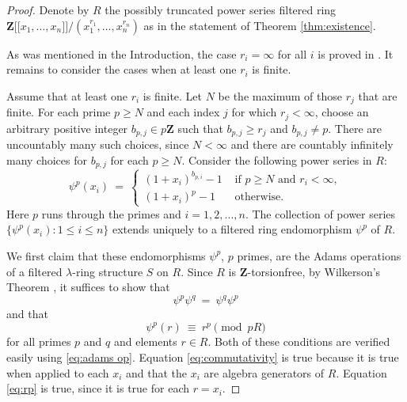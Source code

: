 \documentclass[reqno,11pt]{amsart}
\numberwithin{equation}{subsection}  %
\newcommand{\bZ}{\mathbf{Z}}
\begin{document}
\begin{proof}
Denote by $R$ the possibly truncated power series filtered ring $\bZ \lbrack \lbrack x_1, \ldots, x_n \rbrack \rbrack/(x_1^{r_1}, \ldots, x_n^{r_n})$ as in the statement of Theorem \ref{thm:existence}.


As was mentioned in the Introduction, the case $r_i = \infty$ for all $i$ is proved in \cite{yau2}.  It remains to consider the cases when at least one $r_i$ is finite.


Assume that at least one $r_i$ is finite.  Let $N$ be the maximum of those $r_j$ that are finite.  For each prime $p \geq N$ and each index $j$ for which $r_j < \infty$, choose an arbitrary positive integer $b_{p,j} \in p \bZ$ such that $b_{p,j} \geq r_j$ and $b_{p,j} \not= p$.  There are uncountably many such choices, since $N < \infty$ and there are countably infinitely many choices for $b_{p,j}$ for each $p \geq N$.  Consider the following power series in $R$:
   \begin{equation}
   \label{eq:adams op}
   \psi^p(x_i) ~=~ \begin{cases}
                   (1 + x_i)^{b_{p,i}} - 1 & \text{ if } p \geq N \text{ and } r_i < \infty, \\
                   (1 + x_i)^p - 1         & \text{ otherwise}.\end{cases}
   \end{equation}
Here $p$ runs through the primes and $i = 1, 2, \ldots, n$.  The collection of power series $\lbrace \psi^p(x_i) \colon 1 \leq i \leq n \rbrace$ extends uniquely to a filtered ring endomorphism $\psi^p$ of $R$.


We first claim that these endomorphisms $\psi^p$, $p$ primes, are the Adams operations of a filtered $\lambda$-ring structure $S$ on $R$.  Since $R$ is $\bZ$-torsionfree, by Wilkerson's Theorem \cite{wil}, it suffices to show that 
   \begin{equation}
   \label{eq:commutativity}
   \psi^p \psi^q ~=~ \psi^q \psi^p
   \end{equation}
and that 
   \begin{equation}
   \label{eq:rp}
   \psi^p(r) ~\equiv~ r^p \pmod{pR}
   \end{equation}
for all primes $p$ and $q$ and elements $r \in R$.  Both of these conditions are verified easily using \eqref{eq:adams op}.  Equation \eqref{eq:commutativity} is true because it is true when applied to each $x_i$ and that the $x_i$ are algebra generators of $R$.  Equation \eqref{eq:rp} is true, since it is true for each $r = x_i$.



\end{proof}
\end{document}

